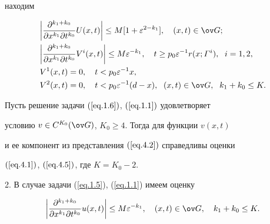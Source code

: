 находим


\begin{align}


&\bigg|\frac{\partial^{k_1+k_0}}{\partial x^{k_1}\partial t^{k_0}}


U(x, t)\bigg|\le


M [1+\varepsilon^{2-k_1}], \quad (x, t)\in \ov G;\notag\\


\label{eq.4.5}


&\bigg|\frac{\partial^{k_1+k_0}}{\partial x^{k_1} \partial t^{k_0}}


V^i(x, t)\bigg|\le


M \varepsilon^{-k_1}, \quad


t\ge p_0 \varepsilon^{-1} r(x; \varGamma^i), \ \; i=1,2,\\


&V^1(x, t)=0, \quad t< p_0 \varepsilon^{-1} x,\notag\\


&V^2(x, t)=0, \quad t< p_0 \varepsilon^{-1} (d-x), \ \; (x, t)\in \ov G,


\ \; k_1+k_0\le K. \notag


\end{align}





\begin{thms} \label{t4.1}


Пусть решение задачи $(\ref{eq.1.6})$, $(\ref{eq.1.1})$ удовлетворяет


условию $v\in C^{K_0}(\ov G)$, $K_0\ge 4$. Тогда для функции $v(x, t)$


и ее компонент из представления $(\ref{eq.4.2})$ справедливы оценки


$(\ref{eq.4.1})$, $(\ref{eq.4.5})$, где $K=K_0-2$.


\end{thms}





2. В случае задачи (\ref{eq.1.5}), (\ref{eq.1.1}) имеем оценку


\begin{equation}


\label{eq.4.6}


\bigg|\frac{\partial^{k_1+k_0}}{\partial x^{k_1} \partial t^{k_0}}


u(x, t)\bigg|\le


M \varepsilon^{-k_1}, \quad (x, t)\in \ov G, \quad


k_1+k_0\le K.


\end{equation}


